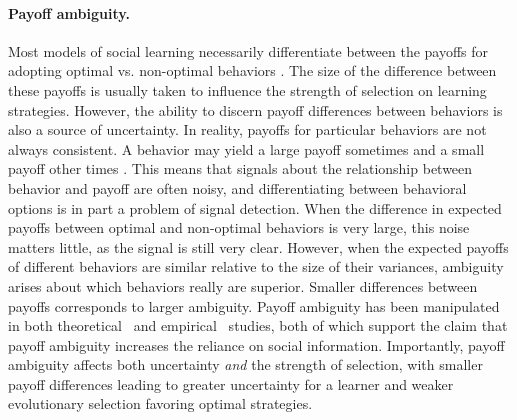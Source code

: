 \documentclass[letterpaper,11.5pt]{scrartcl}
\begin{document}
\paragraph{Payoff ambiguity.} Most models of social learning necessarily differentiate between the payoffs for adopting optimal vs. non-optimal behaviors
\citep{BoydRicherson1985,Rogers1988,Enquist2007,Rendell2010,aoki2014evolution}. The size of the difference between these payoffs is usually taken to influence the strength of selection on learning strategies. %
However, the ability to discern payoff differences between behaviors is also a source of uncertainty. In reality, payoffs for particular behaviors are not always consistent. A behavior may yield a large payoff sometimes and a small
payoff other times \citep{McElreath2005}. This means that signals about the
relationship between behavior and payoff are often noisy, and differentiating
between behavioral options is in part a problem of signal detection. When the
difference in expected payoffs between optimal and non-optimal behaviors is very
large, this noise matters little, as the signal is still very clear. However, when
the expected payoffs of different behaviors are similar relative to the size of
their variances, ambiguity arises about which behaviors really are superior.
Smaller differences between payoffs corresponds to larger ambiguity. Payoff
ambiguity has been manipulated in both theoretical~\citep{perreault2012bayesian}
and empirical~\citep{McElreath2005, Morgan2012} studies, both of which support the
claim that payoff ambiguity increases the reliance on social information.
Importantly, payoff ambiguity %
affects both uncertainty \emph{and} the strength of selection, with smaller payoff differences leading to greater uncertainty for a learner and weaker evolutionary selection favoring optimal strategies. %
\end{document}
